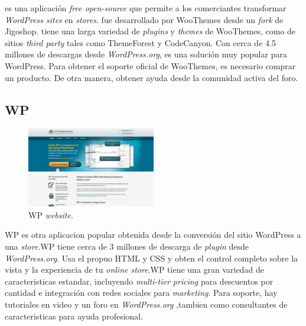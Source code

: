 \nameWooCommerce es una aplicación \ecommerce \textit{free open-source} que permite a los comerciantes transformar \textit{WordPress sites} en \textit{stores}. \nameWooCommerce fue desarrollado por WooThemes desde un \textit{fork} de Jigoshop. \nameWooCommerce tiene una larga variedad de  \textit{plugins} y  \textit{themes} de WooThemes, como de sitios \textit{third party} tales como ThemeForest\cite{online_ThemeForest} y CodeCanyon\cite{online_CodeCanyon}. Con cerca de 4.5 millones de descargas desde \textit{WordPress.org}\cite{online_WordPress}, \nameWooCommerce es una solución \ecommerce muy popular para WordPress. Para obtener el soporte oficial de WooThemes, es necesario comprar un producto. De otra manera, obtener ayuda desde la comunidad activa del foro.

\newcommand{\nameWPECommerce}{WP \ecommerce }
\subsection{\nameWPECommerce}

\begin{figure}[h!]
	\centering
	\includegraphics[width=0.5\textwidth]{figuras/cap1/WPECommerceWebsite.jpg}
	\caption{\nameWPECommerce \textit{website}\cite{online_WPECommerce}.}
\end{figure}

\nameWPECommerce es otra aplicacion popular obtenida desde la conversión del  sitio WordPress a una \ecommerce \textit{store}.\nameWPECommerce tiene cerca de 3 millones de descarga de \textit{plugin} desde \textit{WordPress.org}. Usa el propuo HTML y CSS y obten el control completo sobre la vista y la experiencia de tu \textit{online store}.\nameWPECommerce tiene una gran variedad de caracteristicas estandar, incluyendo \textit{ multi-tier pricing} para descuentos por cantidad e integración con redes sociales para \textit{marketing}. Para soporte, hay tutoriales en video y un foro en  \textit{ WordPress.org} ,tambien como consultantes de caracteristicas para ayuda profesional.

\newcommand{\nameJigoshop}{Jigoshop }
